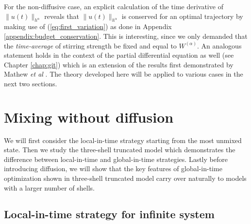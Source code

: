  For the non-diffusive case, an explicit calculation of the time derivative of $\| u(t)\|_{h^{\alpha}}$ reveals that $\| u(t)\|_{h^{\alpha}}$ is conserved for an optimal trajectory by making use of (\ref{eq:first_variation}) as done in Appendix \ref{appendix:budget_conservation}. This is interesting, since we only demanded that the {\it time-average} of stirring strength be fixed and equal to $W^{(\alpha)}$. An analogous statement holds in the context of the partial differential equation as well (see Chapter \ref{chap:git}) which is an extension of the results first demonstrated by Mathew {\it et al} \cite{Mathew2007b}. The theory developed here will be applied to various cases in the next two sections.


\section{Mixing without diffusion}
\label{sec:nondiffusivecase}

We will first consider the local-in-time strategy starting from the most unmixed state. Then we study the three-shell truncated model which demonstrates the difference between local-in-time and global-in-time strategies. Lastly before introducing diffusion, we will show that the key features of global-in-time optimization shown in three-shell truncated model carry over naturally to models with a larger number of shells.

\subsection{Local-in-time strategy for infinite system}
\label{sec:LIT_MUIC}


